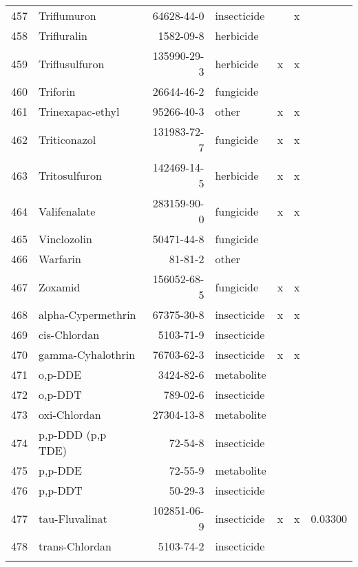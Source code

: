 \begin{longtable}{lp{3cm}rlp{1cm}p{1cm}p{1.5cm}}
  457 & Triflumuron & 64628-44-0 & insecticide &  & x &  \\ 
  458 & Trifluralin & 1582-09-8 & herbicide &  &  &  \\ 
  459 & Triflusulfuron & 135990-29-3 & herbicide & x & x &  \\ 
  460 & Triforin & 26644-46-2 & fungicide &  &  &  \\ 
  461 & Trinexapac-ethyl & 95266-40-3 & other & x & x &  \\ 
  462 & Triticonazol & 131983-72-7 & fungicide & x & x &  \\ 
  463 & Tritosulfuron & 142469-14-5 & herbicide & x & x &  \\ 
  464 & Valifenalate & 283159-90-0 & fungicide & x & x &  \\ 
  465 & Vinclozolin & 50471-44-8 & fungicide &  &  &  \\ 
  466 & Warfarin & 81-81-2 & other &  &  &  \\ 
  467 & Zoxamid & 156052-68-5 & fungicide & x & x &  \\ 
  468 & alpha-Cypermethrin & 67375-30-8 & insecticide & x & x &  \\ 
  469 & cis-Chlordan & 5103-71-9 & insecticide &  &  &  \\ 
  470 & gamma-Cyhalothrin & 76703-62-3 & insecticide & x & x &  \\ 
  471 & o,p-DDE & 3424-82-6 & metabolite &  &  &  \\ 
  472 & o,p-DDT & 789-02-6 & insecticide &  &  &  \\ 
  473 & oxi-Chlordan & 27304-13-8 & metabolite &  &  &  \\ 
  474 & p,p-DDD (p,p TDE) & 72-54-8 & insecticide &  &  &  \\ 
  475 & p,p-DDE & 72-55-9 & metabolite &  &  &  \\ 
  476 & p,p-DDT & 50-29-3 & insecticide &  &  &  \\ 
  477 & tau-Fluvalinat & 102851-06-9 & insecticide & x & x & 0.03300 \\ 
  478 & trans-Chlordan & 5103-74-2 & insecticide &  &  &  \\ 
  \label{tab:phch_var}
\end{longtable}
